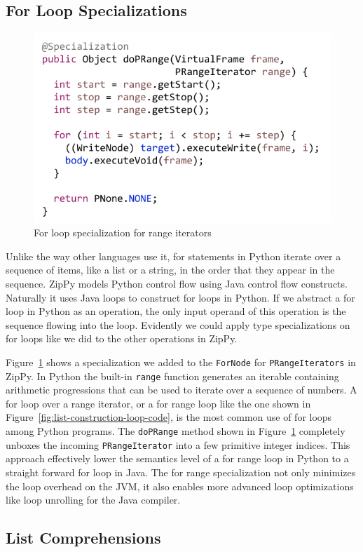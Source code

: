 \subsection{For Loop Specializations}

\begin{figure}
\centering
\includegraphics[scale=.9]{figures/ch3-for-range-node-code.pdf}
\caption{For loop specialization for range iterators}
\label{fig:for-range-node}
\end{figure}

Unlike the way other languages use it, for statements in Python iterate over a sequence of items, like a list or a string, in the order that they appear in the sequence.
ZipPy models Python control flow using Java control flow constructs.
Naturally it uses Java loops to construct for loops in Python.
If we abstract a for loop in Python as an operation, the only input operand of this operation is the sequence flowing into the loop.
Evidently we could apply type specializations on for loops like we did to the other operations in ZipPy.

Figure~\ref{fig:for-range-node} shows a specialization we added to the \texttt{ForNode} for \texttt{PRangeIterators} in ZipPy.
In Python the built-in \texttt{range} function generates an iterable containing arithmetic progressions that can be used to iterate over a sequence of numbers.
A for loop over a range iterator, or a for range loop like the one shown in Figure~\ref{fig:list-construction-loop-code}, is the most common use of for loops among Python programs.
The \texttt{doPRange} method shown in Figure~\ref{fig:for-range-node} completely unboxes the incoming \texttt{PRangeIterator} into a few primitive integer indices.
This approach effectively lower the semantics level of a for range loop in Python to a straight forward for loop in Java.
The for range specialization not only minimizes the loop overhead on the JVM, it also enables more advanced loop optimizations like loop unrolling for the Java compiler.

\subsection{List Comprehensions}
